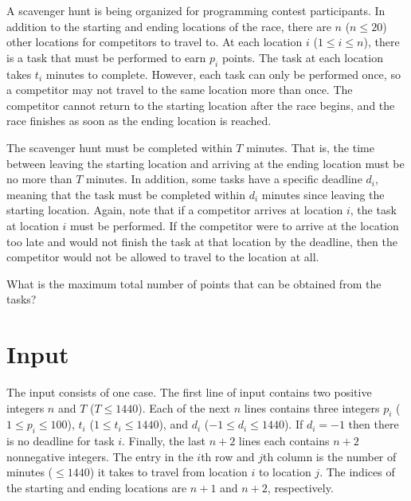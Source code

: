
\setlength{\columnsep}{15pt}


A scavenger hunt is being organized for programming contest
participants.  In addition to the starting and ending locations of the
race, there are $n$ ($n \leq 20$) other locations for competitors to
travel to.  At each location $i$ ($1 \leq i \leq n$), there is a task
that must be performed to earn $p_i$ points.  The task at each location
takes $t_i$ minutes to complete.  However, each
task can only be performed once, so a competitor may not travel to the
same location more than once.  The competitor cannot return to the starting
location after the race begins, and the race finishes as soon as the ending
location is reached.

The scavenger hunt must be completed within $T$ minutes.  That is, the
time between leaving the starting location and arriving at the ending
location must be no more than $T$ minutes.  In addition, some tasks
have a specific deadline $d_i$, meaning that the task must be
completed within $d_i$ minutes since leaving the starting location.
Again, note that if a competitor arrives at location $i$, the task at
location $i$ must be performed.  If the competitor were to arrive at
the location too late and would not finish the task at that location
by the deadline, then the competitor would not be allowed to travel to
the location at all.

What is the maximum total number of points that can be obtained from the 
tasks?

\section*{Input}

The input consists of one case.  The first line of input contains 
two positive integers $n$ and $T$ ($T \leq 1440$).  Each of the next
$n$ lines contains three integers $p_i$ ($1 \leq p_i \leq 100$), $t_i$
($1 \leq t_i \leq 1440$), and $d_i$ ($-1 \leq d_i \leq 1440$).  If
$d_i = -1$ then there is no deadline for task $i$.  Finally, the last
$n+2$ lines each contains $n+2$ nonnegative integers.  The entry in the
$i$th row and $j$th column is the number of minutes ($\leq 1440$) it
takes to travel from location $i$ to location $j$.  The indices of the
starting and ending locations are $n+1$ and $n+2$, respectively.  

